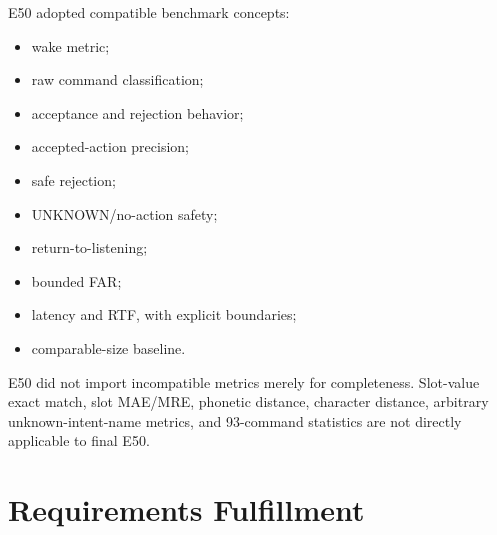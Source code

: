 \documentclass[11pt]{article}
\begin{document}
E50 adopted compatible benchmark concepts:

\begin{itemize}
\item wake metric;
\item raw command classification;
\item acceptance and rejection behavior;
\item accepted-action precision;
\item safe rejection;
\item UNKNOWN/no-action safety;
\item return-to-listening;
\item bounded FAR;
\item latency and RTF, with explicit boundaries;
\item comparable-size baseline.
\end{itemize}

E50 did not import incompatible metrics merely for completeness. Slot-value exact match, slot MAE/MRE, phonetic distance, character distance, arbitrary unknown-intent-name metrics, and 93-command statistics are not directly applicable to final E50.
\newpage
\section{Requirements Fulfillment}
\end{document}
